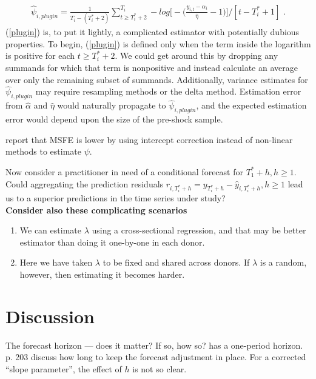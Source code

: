 \documentclass[11pt]{article}
\theoremstyle{definition}
\begin{document}
\begin{align}
\hat\psi_{i,plugin} = \frac{1}{T_{i}-(T_{i}^{*}+2)}\sum^{T_{i}}_{t\geq T_{i}^{*}+2}-log{\big[-\big(\frac{y_{i,t}-\hat\alpha_{i}}{\hat\eta} -1\big)\big]} / [t-T_{i}^{*}+1]\text{ .}\label{plugin}
\end{align}
(\ref{plugin}) is, to put it lightly, a complicated estimator with potentially dubious properties.  To begin, (\ref{plugin}) is defined only when the term inside the logarithm is positive for each $t\geq T^{*}_{i}+2$.  We could get around this by dropping any summands for which that term is nonpositive and instead calculate an average over only the remaining subset of summands.  Additionally, variance estimates for $\hat\psi_{i,plugin}$ may require resampling methods or the delta method.  Estimation error from $\hat\alpha$ and $\hat\eta$ would naturally propagate to $\hat\psi_{i,plugin}$, and the expected estimation error would depend upon the size of the pre-shock sample.

\cite{castle2011forecasting} report that MSFE is lower by using intercept correction instead of non-linear methods to estimate $\psi$.

Now consider a practitioner in need of a conditional forecast for $T_{1}^{*}+h, h\geq 1$.  Could aggregating the prediction residuals $r_{i,T_{i}^{*}+h} = y_{T_{i}^{*}+h}-\hat y_{i, T_{i}^{*}+h}, h\geq 1$ lead us to a superior predictions in the time series under study?\\

\textbf{Consider also these complicating scenarios}
\begin{enumerate}
  \item We can estimate $\lambda$ using a cross-sectional regression, and that may be better estimator than doing it one-by-one in each donor.
  \item Here we have taken $\lambda$ to be fixed and shared across donors.  If $\lambda$ is a random, however, then estimating it becomes harder.
\end{enumerate}



\section{Discussion}

The forecast horizon --- does it matter?  If so, how so?  \cite{lin2021minimizing} has a one-period horizon.  \cite{clements1998forecasting}{p. 203} discuss how long to keep the forecast adjustment in place.  For a corrected ``slope parameter'', the effect of $h$ is not so clear.\\
\end{document}
